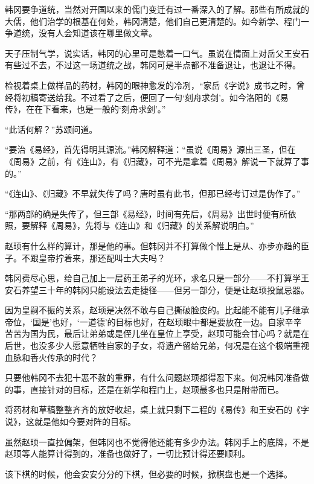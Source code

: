 韩冈要争道统，当然对开国以来的儒门变迁有过一番深入的了解。那些有所成就的大儒，他们治学的根基在何处，韩冈清楚，他们自己更清楚的。如今新学、程门一争道统，没有人会知道该在哪里做文章。

天子压制气学，说实话，韩冈的心里可是憋着一口气。虽说在情面上对岳父王安石有些过不去，不过这一场道统之战，韩冈可是半点都不准备退让，也退让不得。

检视着桌上做样品的药材，韩冈的眼神愈发的冷冽，“家岳《字说》成书之时，曾经将初稿寄送给我。不过看了之后，便回了一句‘刻舟求剑’。如今洛阳的《易传》，在在下看来，也是一般的‘刻舟求剑’。”

“此话何解？”苏颂问道。

“要治《易经》，首先得明其源流。”韩冈解释道：“虽说《周易》源出三圣，但在《周易》之前，有《连山》，有《归藏》，可不光是拿着《周易》解说一下就算了事的。”

“《连山》、《归藏》不早就失传了吗？唐时虽有此书，但那已经考订过是伪作了。”

“那两部的确是失传了，但三部《易经》，时间有先后，《周易》出世时便有所依照，要解释《周易》，先将与《连山》和《归藏》的关系解说明白。”

赵顼有什么样的算计，那是他的事。但韩冈并不打算做个惟上是从、亦步亦趋的臣子。不跟皇帝拧着来，那还配叫士大夫吗？

韩冈费尽心思，给自己加上一层药王弟子的光环，求名只是一部分——不打算学王安石养望三十年的韩冈只能设法去走捷径——但另一部分，便是让赵顼投鼠忌器。

因为皇嗣不振的关系，赵顼是决然不敢与自己撕破脸皮的。比起能不能有儿子继承帝位，‘国是’也好，‘一道德’的目标也好，在赵顼眼中都是要放在一边。自家辛辛苦苦为国为民，最后让弟弟或是侄儿坐在皇位上享受，赵顼可能会甘心吗？就是在后世，也没多少人愿意牺牲自家的子女，将遗产留给兄弟，何况是在这个极端重视血脉和香火传承的时代？

只要他韩冈不去犯十恶不赦的重罪，有什么问题赵顼都得忍下来。何况韩冈准备做的事，直接针对的目标，还是在新学和程门上，赵顼最多也只是附带而已。

将药材和草稿整整齐齐的放好收起，桌上就只剩下二程的《易传》和王安石的《字说》，这就是他如今要对阵的目标。

虽然赵顼一直拉偏架，但韩冈也不觉得他还能有多少办法。韩冈手上的底牌，不是赵顼等人能算计得到的，准备也做好了，一切比预计得还要顺利。

该下棋的时候，他会安安分分的下棋，但必要的时候，掀棋盘也是一个选择。

